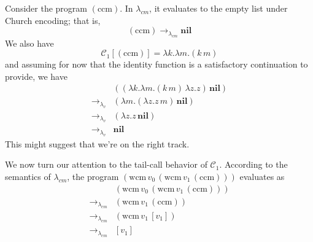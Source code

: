 \documentclass[ms,electronic,twosidetoc,letterpaper,chaptercenter,parttop]{byumsphd}
\begin{document}
Consider the program $(\mathrm{ccm})$. In $\lambda_{cm}$, it evaluates to the empty list under 
Church encoding; that is,
\[
(\mathrm{ccm})\rightarrow_{\lambda_{cm}}\mathbf{nil}
\]
We also have
\[
\mathcal{C}_{1}[(\mathrm{ccm})]=\lambda k.\lambda m.(k\,m)
\]
and assuming for now that the identity function is a satisfactory continuation to provide, 
we have
\begin{align*}
                          &((\lambda k.\lambda m.(k\,m)\,\lambda z.z)\,\mathbf{nil})\\
\rightarrow_{\lambda_{v}} &(\lambda m.(\lambda z.z\,m)\,\mathbf{nil})\\
\rightarrow_{\lambda_{v}} &(\lambda z.z\,\mathbf{nil})\\
\rightarrow_{\lambda_{v}} &\mathbf{nil}
\end{align*}
This might suggest that we're on the right track.

We now turn our attention to the tail-call behavior of $\mathcal{C}_{1}$. According to the 
semantics of $\lambda_{cm}$, the program 
$(\mathrm{wcm}\,v_0\,(\mathrm{wcm}\,v_1\,(\mathrm{ccm})))$ evaluates as
\begin{align*}
                          &(\mathrm{wcm}\,v_0\,(\mathrm{wcm}\,v_1\,(\mathrm{ccm})))\\
\rightarrow_{\lambda_{cm}}&(\mathrm{wcm}\,v_1\,(\mathrm{ccm}))\\
\rightarrow_{\lambda_{cm}}&(\mathrm{wcm}\,v_1\,[v_1])\\
\rightarrow_{\lambda_{cm}}&[v_1]
\end{align*}
\end{document}
